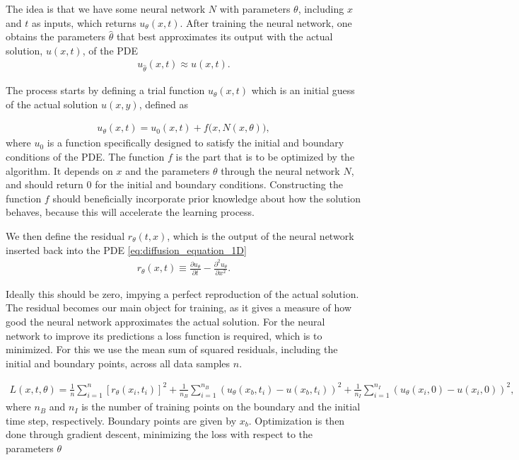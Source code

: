 \documentclass[12pt]{extarticle}
\begin{document}
The idea is that we have some neural network $N$ with parameters $\theta$, including $x$ and $t$ as inputs, which returns $u_{\theta}(x,t)$. After training the neural network, one obtains the parameters $\hat{\theta}$ that best approximates its output with the actual solution, $u(x,t)$, of the PDE
\begin{align*}
	u_{\hat{\theta}} (x, t) \approx u(x, t).
\end{align*}

The process starts by defining a trial function $u_{\theta}(x,t)$ which is an initial guess of the actual solution $u(x,y)$, defined as

\begin{align}
	u_{\theta}(x,t) = u_0(x, t) + f\big(x, N(x,\theta)\big),
	\label{eq:NN_model}
\end{align}
where $u_0$ is a function specifically designed to satisfy the initial and boundary conditions of the PDE. The function $f$ is the part that is to be optimized by the algorithm. It depends on $x$ and the parameters $\theta$ through the neural network $N$, and should return 0 for the initial and boundary conditions. Constructing the function $f$ should beneficially incorporate prior knowledge about how the solution behaves, because this will accelerate the learning process.

\par We then define the residual $r_\theta(t, x)$, which is the output of the neural network inserted back into the PDE \eqref{eq:diffusion_equation_1D}
\begin{align}
	r_\theta(x, t) \equiv \frac{\partial u_\theta}{\partial t} - \frac{\partial^2 u_\theta}{\partial x^2}.
	\label{eq:residual}
\end{align}

Ideally this should be zero, impying a perfect reproduction of the actual solution. The residual becomes our main object for training, as it gives a measure of how good the neural network approximates the actual solution. For the neural network to improve its predictions a loss function is required, which is to minimized. For this we use the mean sum of squared residuals, including the initial and boundary points, across all data samples $n$. 

\begin{align*}
	L(x, t, \theta) = \frac{1}{n} \sum_{i=1}^n [r_\theta(x_i,t_i)]^2 + \frac{1}{n_B}\sum_{i=1}^{n_B} (u_{\theta}(x_b,t_i) - u(x_b,t_i))^2 + \frac{1}{n_I} \sum_{i=1}^{n_I} (u_{\theta}(x_i,0) - u(x_i,0))^2,
\end{align*}
where $n_B$ and $n_I$ is the number of training points on the boundary and the initial time step, respectively. Boundary points are given by $x_b$.
Optimization is then done through gradient descent, minimizing the loss with respect to the parameters $\theta$
\end{document}
